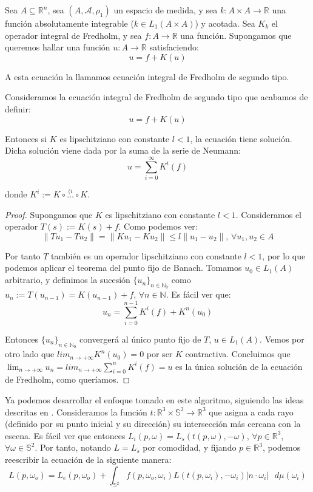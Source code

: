 \begin{definicion}
  Sea $A\subseteq \mathds{R}^n$, sea $(A, \mathcal{A}, \rho_1)$ un espacio de medida, y sea $k:A\times A\rightarrow \mathds{R}$ una función absolutamente integrable ($k\in L_1(A\times A)$) y acotada. Sea $K_k$ el operador integral de Fredholm, y sea $f:A\rightarrow \mathds{R}$ una función. Supongamos que queremos hallar una función $u:A\rightarrow \mathds{R}$ satisfaciendo:
$$u = f+K(u) $$

  A esta ecuación la llamamos ecuación integral de Fredholm de segundo tipo.
  \end{definicion}

\begin{teorema}\label{convergeFred}
  Consideramos la ecuación integral de Fredholm de segundo tipo que acabamos de definir:
  $$u = f+K(u) $$

  Entonces si $K$ es lipschitziano con constante $l<1$, la ecuación tiene solución. Dicha solución viene dada por la suma de la serie de Neumann:
  $$u=\sum_{i=0}^{\infty} K^i(f) $$

  donde $K^i:=K\circ \overset{(i}{\ldots}\circ K$.
  \end{teorema}
\begin{proof}
  Supongamos que $K$ es lipschitziano con constante $l<1$. Consideramos el operador $T(s):=K(s)+f$. Como podemos ver:
$$\|Tu_1-Tu_2\| = \|Ku_1-Ku_2\| \leq l\|u_1-u_2\|\text{, } \forall u_1,u_2\in A$$

  Por tanto $T$ también es un operador lipschitziano con constante $l<1$, por lo que podemos aplicar el teorema del punto fijo de Banach. Tomamos $u_0\in L_1(A)$ arbitrario, y definimos la sucesión $\{u_n\}_{n\in\mathds{N}_0}$ como $u_n := T(u_{n-1}) = K(u_{n-1})+f$, $\forall n\in\mathds{N}$. Es fácil ver que:
  $$u_n = \sum_{i=0}^{n-1}K^i(f) + K^n(u_0)$$

Entonces $\{u_n\}_{n\in\mathds{N}_0}$ convergerá al único punto fijo de $T$, $u\in L_1(A)$. Vemos por otro lado que $lim_{n\to +\infty}K^n(u_0) = 0$ por ser $K$ contractiva. Concluimos que $\lim_{n\to +\infty}u_n =lim_{n\to +\infty} \sum_{i=0}^{n}K^i(f) = u$ es la única solución de la ecuación de Fredholm, como queríamos.

  \end{proof}

Ya podemos desarrollar el enfoque tomado en este algoritmo, siguiendo las ideas descritas en \cite{Dimov2005}. Consideramos la función $t:\mathds{R}^3\times \mathds{S}^2\rightarrow \mathds{R}^3$ que asigna a cada rayo (definido por su punto inicial y su dirección) su intersección más cercana con la escena. Es fácil ver que entonces $L_i(p,\omega) = L_s(t(p,\omega), -\omega)$, $\forall p\in\mathds{R}^3$, $\forall \omega\in\mathds{S}^2$. Por tanto, notando $L=L_s$ por comodidad, y fijando $p\in\mathds{R}^3$, podemos reescribir la ecuación de la siguiente manera:
\begin{equation}\label{rendEq2}
L(p,\omega _o) = L_e(p,\omega_o) + \int _{\mathds{S}^2}f(p,\omega _o, \omega _i) L(t(p,\omega_i), -\omega _i) |n\cdot \omega _i|\text{ }d\mu (\omega _i) 
\end{equation}

